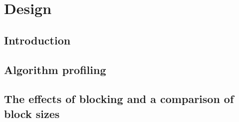 \chapter{Design}
\label{ch:design}

\section{Introduction}
\label{sec:design:Introduction}


\section{Algorithm profiling}
\label{sec:design:algorithmProfiling}


\section{The effects of blocking and a comparison of block sizes}
\label{sec:design:blockSize}

